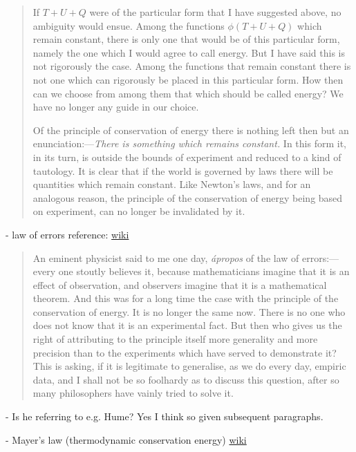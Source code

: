 \documentclass{article}
\begin{document}
 \begin{quote}
     If $T + U + Q$ were of the particular form that I have suggested above, no ambiguity would ensue.  Among the functions $\phi(T + U + Q)$ which remain constant, there is only one that would be of this particular form, namely the one which I would agree to call energy.  But I have said this is not rigorously the case.  Among the functions that remain constant there is not one which can rigorously be placed in this particular form.  How then can we choose from among them that which should be called energy?  We have no longer any guide in our choice.
     
     Of the principle of conservation of energy there is nothing left then but an enunciation:---\emph{There is something which remains constant.}  In this form it, in its turn, is outside the bounds of experiment and reduced to a kind of tautology.  It is clear that if the world is governed by laws there will be quantities which remain constant.  Like Newton's laws, and for an analogous reason, the principle of the conservation of energy being based on experiment, can no longer be invalidated by it.  \citep[p. 127-128]{Poincare1952}
 \end{quote}
 
 - law of errors reference: \href{https://en.wikipedia.org/wiki/Laplace_distribution}{wiki}
 
 \begin{quote}
     An eminent physicist said to me one day, \emph{\'apropos} of the law of errors:---every one stoutly believes it, because mathematicians imagine that it is an effect of observation, and observers imagine that it is a mathematical theorem.  And this was for a long time the case with the principle of the conservation of energy.  It is no longer the same now.  There is no one who does not know that it is an experimental fact.  But then who gives us the right of attributing to the principle itself more generality and more precision than to the experiments which have served to demonstrate it?  This is asking, if it is legitimate to generalise, as we do every day, empiric data, and I shall not be so foolhardy as to discuss this question, after so many philosophers have vainly tried to solve it.  \citep[p. 129]{Poincare1952}
 \end{quote}
 
 - Is he referring to e.g. Hume?  Yes I think so given subsequent paragraphs.
 
 - Mayer's law (thermodynamic conservation energy) \href{https://en.wikipedia.org/wiki/Julius_von_Mayer}{wiki}
 
\end{document}

